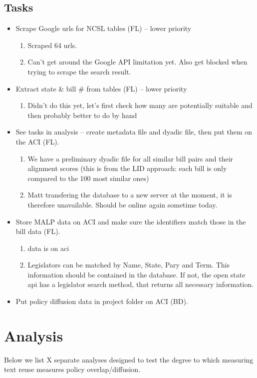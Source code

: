 \documentclass[12pt]{article} %
\begin{document}
\subsection{Tasks}
\begin{itemize}
\item Scrape Google urls for NCSL tables (FL) -- lower priority
    \begin{enumerate}
        \item Scraped 64 urls. 
        \item Can't get around the Google API limitation yet. Also get blocked when trying to scrape the search result.
    \end{enumerate}

\item Extract state  \& bill \# from tables (FL) -- lower priority
    \begin{enumerate}
        \item Didn't do this yet, let's first check how many are potentially suitable and then probably better to do by hand
    \end{enumerate}
\item See tasks in analysis -- create metadata file and dyadic file, then put them on the ACI (FL).
    \begin{enumerate}
        \item We have a preliminary dyadic file for all similar bill pairs and their alignment scores (this is from the LID approach: each bill is only compared to the 100 most similar ones)
        \item Matt transfering the database to a new server at the moment, it is therefore unavailable. Should be online again sometime today.
    \end{enumerate}
\item Store MALP data on ACI and make sure the identifiers match those in the bill data (FL). 
    \begin{enumerate}
        \item data is on aci
        \item Legislators can be matched by Name, State, Pary and Term. This information should be contained in the database. If not, the open state api has a legislator search method, that returns all necessary information.
    \end{enumerate}
\item Put policy diffusion data in project folder on ACI (BD).
\end{itemize}

\section{Analysis}
 Below we list X separate analyses designed to test the degree to which measuring text reuse measures policy overlap/diffusion. 
\end{document}
